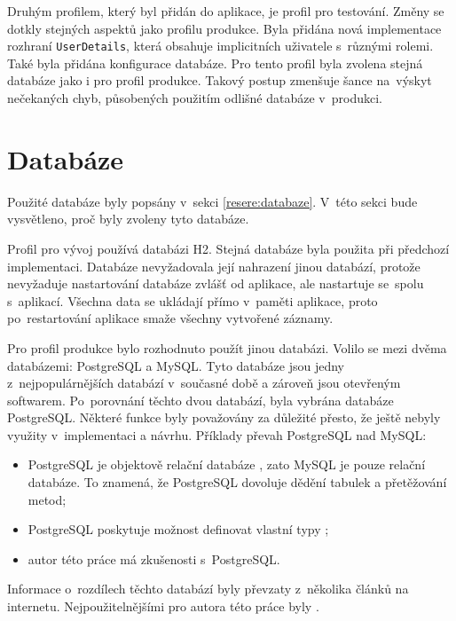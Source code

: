     Druhým profilem, který byl přidán do aplikace, je profil pro testování. Změny se dotkly stejných aspektů jako profilu produkce. Byla přidána nová implementace rozhraní \verb|UserDetails|, která obsahuje implicitních uživatele s~různými rolemi. Také byla přidána konfigurace databáze. Pro tento profil byla zvolena stejná databáze jako i pro profil produkce. Takový postup zmenšuje šance na~výskyt nečekaných chyb, působených použitím odlišné databáze v~produkci.
    
\section{Databáze} \label{navrh:db}
    Použité databáze byly popsány v~sekci \ref{resere:databaze}. V~této sekci bude vysvětleno, proč byly zvoleny tyto databáze.
    
    Profil pro vývoj používá databázi H2. Stejná databáze byla použita při předchozí implementaci. Databáze nevyžadovala její nahrazení jinou databází, protože nevyžaduje nastartování databáze zvlášť od aplikace, ale nastartuje se~spolu s~aplikací. Všechna data se ukládají přímo v~paměti aplikace, proto po~restartování aplikace smaže všechny vytvořené záznamy.
    
    Pro profil produkce bylo rozhodnuto použít jinou databázi. Volilo se mezi dvěma databázemi: PostgreSQL a MySQL. Tyto databáze jsou jedny z~nejpopulárnějších databází v~současné době a zároveň jsou otevřeným softwarem. Po~porovnání těchto dvou databází, byla vybrána databáze PostgreSQL. Některé funkce byly považovány za důležité přesto, že ještě nebyly využity v~implementaci a návrhu. Příklady převah PostgreSQL nad MySQL: 
    \begin{itemize}
            \item PostgreSQL je objektově relační databáze \cite{postgres-about}, zato MySQL je pouze relační databáze. To znamená, že PostgreSQL dovoluje dědění tabulek a přetěžování metod;
            \item PostgreSQL poskytuje možnost definovat vlastní typy \cite{pstgres-create-type};
            \item autor této práce má zkušenosti s~PostgreSQL.
    \end{itemize}
    Informace o~rozdílech těchto databází byly převzaty z~několika článků na internetu. Nejpoužitelnějšími pro autora této práce byly \cite{mysql-postgres1, mysql-postgres2}.
    
